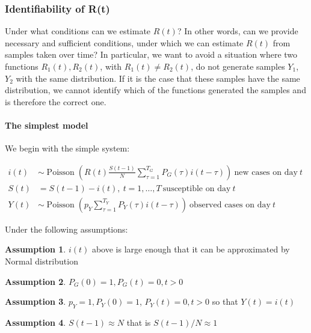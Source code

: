 \documentclass[11pt,a4paper,titlepage]{article}
\theoremstyle{definition}
\newtheorem{assumption}{Assumption}
\begin{document}
\subsubsection{Identifiability of R(t)}

Under what conditions can we estimate $R(t)$?
In other words,
can we provide necessary and sufficient conditions,
under which we can estimate $R(t)$ from samples taken over time?
In particular,
we want to avoid a situation where two functions $R_1(t), R_2(t)$,
with $R_1(t) \neq R_2(t)$,
do not generate samples $Y_1$, $Y_2$ with the same distribution.
If it is the case that these samples have the same distribution,
we cannot identify which of the functions generated the samples
and is therefore the correct one.

\paragraph{The simplest model}

We begin with the simple system:

\begin{align}
    i(t) & \sim  \operatorname{Poisson} \left( R(t) \frac{S(t-1)}{N} \sum\limits_{\tau=1}^{T_G} {P_G(\tau)i(t-\tau)} \right) ~\text{new cases on day} ~ t & \\
    S(t) & = S(t - 1) - i(t), ~t=1,\ldots,T ~  \text{susceptible on day} ~ t & \\
    Y(t) & \sim \operatorname { Poisson }\left(p_{Y} \sum_{\tau=1}^{T_{Y}} P_{Y}(\tau) i(t-\tau)\right) ~ \text{observed cases on day} ~ t &
\end{align}

Under the following assumptions:

\begin{assumption}
    \label{assm:i-normal}
    $i(t)$ above is large enough that it can be approximated by Normal distribution
\end{assumption}
\begin{assumption}
    \label{assm:pg=1}
    $P_G(0) = 1, P_G(t) = 0, t > 0$
\end{assumption}
\begin{assumption}
    \label{assm:py=1}
    $p_Y = 1, P_Y(0) = 1$, $P_Y(t) = 0, t > 0$ so that $Y(t) = i(t)$
\end{assumption}
\begin{assumption}
    \label{assm:s=N}
    $S(t-1) \approx N$ that is $S(t-1)/N \approx 1$
\end{assumption}
\end{document}
